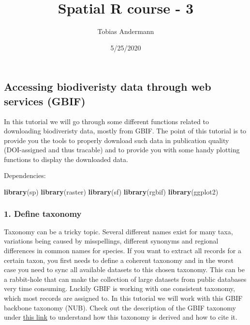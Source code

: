 \documentclass[]{article}
\title{Spatial R course - 3}
\author{Tobias Andermann}
\date{5/25/2020}
\newenvironment{Shaded}{\begin{snugshade}}{\end{snugshade}}
\newcommand{\KeywordTok}[1]{\textcolor[rgb]{0.13,0.29,0.53}{\textbf{#1}}}
\newcommand{\NormalTok}[1]{#1}
\begin{document}
\maketitle

\hypertarget{accessing-biodiveristy-data-through-web-services-gbif}{%
\subsection{Accessing biodiveristy data through web services
(GBIF)}\label{accessing-biodiveristy-data-through-web-services-gbif}}

In this tutorial we will go through some different functions related to
downloading biodiveristy data, mostly from GBIF. The point of this
tutorial is to provide you the tools to properly download such data in
publication quality (DOI-assigned and thus tracable) and to provide you
with some handy plotting functions to display the downloaded data.

Dependencies:

\begin{Shaded}
\begin{Highlighting}[]
\KeywordTok{library}\NormalTok{(sp)}
\KeywordTok{library}\NormalTok{(raster)}
\KeywordTok{library}\NormalTok{(sf)}
\KeywordTok{library}\NormalTok{(rgbif)}
\KeywordTok{library}\NormalTok{(ggplot2)}
\end{Highlighting}
\end{Shaded}

\hypertarget{define-taxonomy}{%
\subsubsection{1. Define taxonomy}\label{define-taxonomy}}

Taxonomy can be a tricky topic. Several different names exist for many
taxa, variations being caused by misspellings, different synonyms and
regional differences in common names for species. If you want to extract
all records for a certain taxon, you first needs to define a coherent
taxonomy and in the worst case you need to sync all available datasets
to this chosen taxonomy. This can be a rabbit-hole that can make the
collection of large datasets from public databases very time consuming.
Luckily GBIF is working with one consistent taxonomy, which most records
are assigned to. In this tutorial we will work with this GBIF backbone
taxonomy (NUB). Check out the description of the GBIF taxonomy under
\href{https://www.gbif.org/dataset/d7dddbf4-2cf0-4f39-9b2a-bb099caae36c\#description}{this
link} to understand how this taxonomy is derived and how to cite it.
\end{document}
